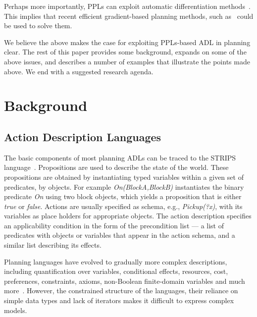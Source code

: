 \documentclass[letterpaper]{article} %
\theoremstyle{definition}
\begin{document}
Perhaps more importantly, PPLs can exploit automatic differentiation methods~\cite{auto-diff}. This implies that
recent efficient gradient-based planning methods, such as~\cite{pmlr-v130-bhandari21a} could be used to solve them.


We believe the above makes the case for exploiting PPLs-based ADL in planning clear. The rest of this paper provides some background, expands on some of the above issues, and describes a number of examples that illustrate the points made above. We end with a suggested research agenda.

\section{Background}
\subsection{Action Description Languages}

The basic components of most planning ADLs can be traced to the STRIPS language~\cite{STRIPS}. Propositions are used to describe the state of the world. These propositions are obtained by instantiating typed variables within a given
set of predicates, by objects. For example {\em On(BlockA,BlockB)} instantiates the binary predicate {\em On}
using two block objects, which yields a proposition that is either {\em true} or {\em false}.
Actions are usually specified as schema, e.g., {\em Pickup(?x)}, with its variables as place holders for appropriate objects. The action description specifies an applicability condition in the form of the precondition list --- a list of predicates with objects or variables that appear in the action schema, and a similar list describing its effects.

Planning languages have evolved to gradually more
complex descriptions, including quantification over
variables, conditional effects, resources, cost, preferences, constraints, axioms, non-Boolean finite-domain variables and much more~\cite{PDDL2.1,PDDL3,SAS+}. However, the constrained structure of the languages, their reliance on simple data types and lack of iterators makes it difficult to express complex models.
\end{document}
